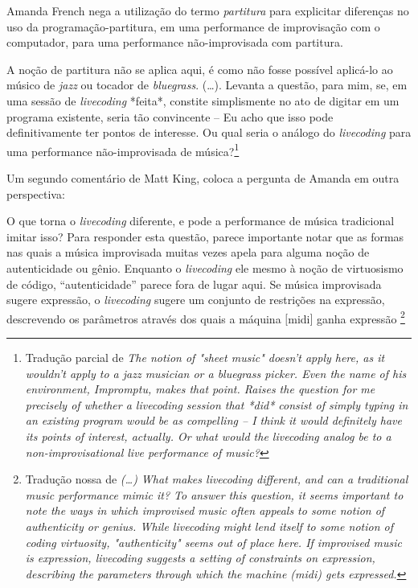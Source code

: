 Amanda French nega a utilização do termo \emph{partitura} para explicitar diferenças no uso da programação-partitura, em uma performance de improvisação com o computador, para uma performance não-improvisada com partitura.

\begin{citacao}
A noção de partitura não se aplica aqui, é como não fosse possível aplicá-lo ao músico de \emph{jazz} ou tocador de \emph{bluegrass}. (\ldots). Levanta a questão, para mim, se, em uma sessão de \emph{livecoding} *feita*, constite simplismente no ato de digitar em um programa existente, seria tão convincente -- Eu acho que isso pode definitivamente ter pontos de interesse. Ou qual seria o análogo do \emph{livecoding} para uma performance não-improvisada de música?\footnote{ Tradução parcial de \emph{The notion of "sheet music" doesn't apply here, as it wouldn't apply to a jazz musician or a bluegrass picker. Even the name of his environment, Impromptu, makes that point. Raises the question for me precisely of whether a livecoding session that *did* consist of simply typing in an existing program would be as compelling -- I think it would definitely have its points of interest, actually. Or what would the livecoding analog be to a non-improvisational live performance of music?}}
\end{citacao}

Um segundo comentário de Matt King, coloca a pergunta de Amanda em outra perspectiva:

\begin{citacao}
O que torna o \emph{livecoding} diferente, e pode a performance de música tradicional imitar isso? Para responder esta questão, parece importante notar que as formas nas quais a música improvisada muitas vezes apela para alguma noção de autenticidade ou gênio. Enquanto o \emph{livecoding} ele mesmo à noção de virtuosismo de código, ``autenticidade'' parece fora de lugar aqui. Se música improvisada sugere expressão, o \emph{livecoding} sugere um conjunto de restrições na expressão, descrevendo os parâmetros através dos quais a máquina $[$midi$]$ ganha expressão \footnote{Tradução nossa de \emph{(\ldots) What makes livecoding different, and can a traditional music performance mimic it? To answer this question, it seems important to note the ways in which improvised music often appeals to some notion of authenticity or genius. While livecoding might lend itself to some notion of coding virtuosity, "authenticity" seems out of place here. If improvised music is expression, livecoding suggests a setting of constraints on expression, describing the parameters through which the machine (midi) gets expressed.}}
\end{citacao}

